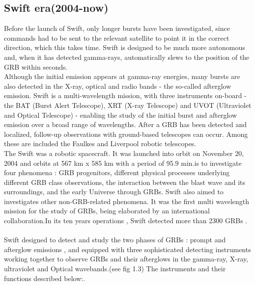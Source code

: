 \subsection{Swift era(2004-now)}
Before the launch of Swift, only longer bursts have been investigated, since commands had to be sent to the relevant satellite to point it in the correct direction, which this takes time. Swift is designed to be much more autonomous and, when it has detected gamma-rays, automatically slews to the position of the GRB within seconds. \\
Although the initial emission appears at gamma-ray energies, many bursts are also detected in the X-ray, optical and radio bands - the so-called afterglow emission. Swift is a multi-wavelength mission, with three instruments on-board - the BAT (Burst Alert Telescope), XRT (X-ray Telescope) and UVOT (Ultraviolet and Optical Telescope) - enabling the study of the initial burst and afterglow emission over a broad range of wavelengths. After a GRB has been detected and localized, follow-up observations with ground-based telescopes can occur. Among these are included the Faulkes and Liverpool robotic telescopes. \\
The Swift was a robotic spacecraft. It was launched into orbit on November 20, 2004 
and  orbits at 567 km x 585 km with a period of 95.9 min.is to investigate four phenomena : GRB progenitors, different physical processes underlying different GRB class observations, the interaction between the blast wave and its surroundings, and the early Universe through GRBs. Swift also aimed to investigates other non-GRB-related phenomena. It was the first multi wavelength mission for the study of GRBs, being elaborated by an international collaboration.In its ten years operations , Swift detected more than 2300 GRBs \citep{4} \citep{6}.\\\\
Swift designed to detect and study the two phases of GRBs : prompt and afterglow emissions , and equipped with  three sophisticated detecting instruments working together to observe GRBs and their afterglows in the gamma-ray, X-ray, ultraviolet and Optical wavebands.(see fig 1.3) The  instruments and their functions described below:\citep{8}\cite{9}.\\

